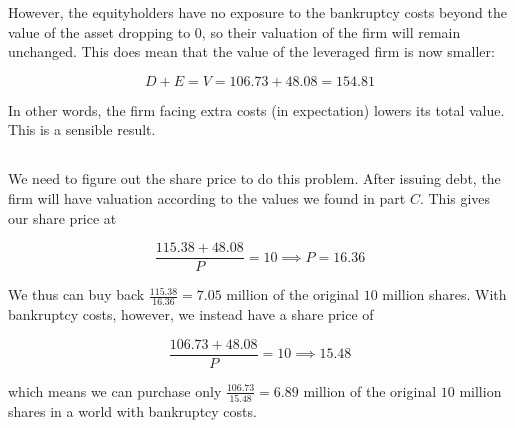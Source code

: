 \documentclass[12pt, letterpaper, parskip = full]{article}
\begin{document}
	However, the equityholders have no exposure to the bankruptcy costs beyond the value of the asset dropping to \(0\), so their valuation of the firm will remain unchanged. This does mean that the value of the leveraged firm is now smaller:

	\[ D + E = V = 106.73 + 48.08 = 154.81  \]

	In other words, the firm facing extra costs (in expectation) lowers its total value. This is a sensible result.

	\subsection{}

	We need to figure out the share price to do this problem. After issuing debt, the firm will have valuation according to the values we found in part \(C\). This gives our share price at

	\[ \frac{115.38 + 48.08}{P} = 10 \implies P = 16.36     \]

	We thus can buy back \(\frac{115.38}{16.36} = 7.05\) million of the original \(10\) million shares. With bankruptcy costs, however, we instead have a share price of

	\[ \frac{106.73 + 48.08}{P} = 10 \implies 15.48   \]

	which means we can purchase only \( \frac{106.73}{15.48} = 6.89 \) million of the original \(10\) million shares in a world with bankruptcy costs.
\end{document}
